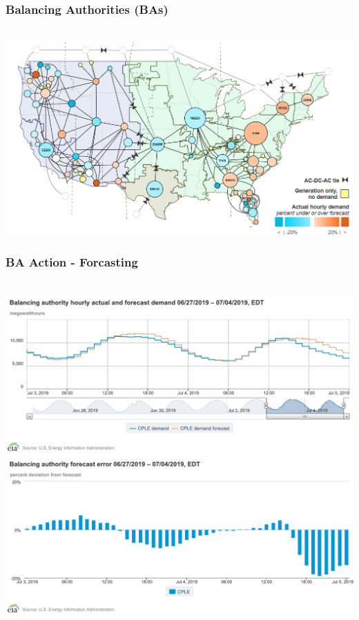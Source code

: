 \documentclass[14pt, unknownkeysallowed]{beamer}
\begin{document}
\begin{frame}
\frametitle{Balancing Authorities (BAs)}\ \vspace{.5em}
{\centering
\href{https://www.eia.gov/realtime_grid/}%
{\includegraphics[width=.95\linewidth]{BAs}} %
}
\end{frame}
\begin{frame}
\frametitle{BA Action - Forcasting} \ \vspace{.5em}
{\centering
{\includegraphics[height=.4\textheight]{chart} 
\includegraphics[height=.4\textheight]{chart1}} %
}
\end{frame}
\end{document}
